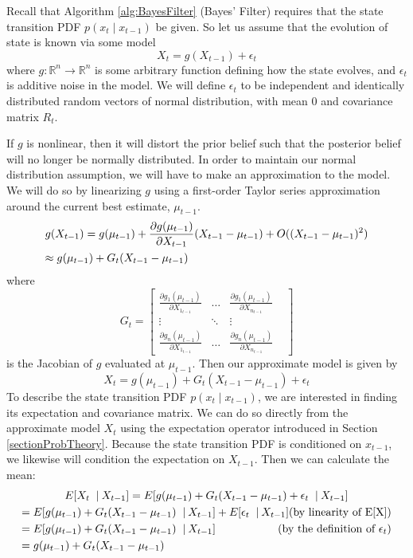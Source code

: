 Recall that Algorithm \ref{alg:BayesFilter} (Bayes' Filter) requires that the state transition PDF \(p(x_t \mathbin{\vert} x_{t-1})\) be given. So let us assume that the evolution of state is known via some model \[X_t =  g(X_{t-1}) + \epsilon_t\] where \(g: \mathbb{R}^n \to \mathbb{R}^n\) is some arbitrary function defining how the state evolves, and \(\epsilon_t\) is additive noise in the model. We will define \(\epsilon_t\) to be independent and identically distributed  random vectors of normal distribution, with mean 0 and covariance matrix \(R_t\).

If \(g\) is nonlinear, then it will distort the prior belief such that the posterior belief will no longer be normally distributed. In order to maintain our normal distribution assumption, we will have to make an approximation to the model. We will do so by linearizing \(g\) using a first-order Taylor series approximation around the current best estimate, \(\mu_{t-1}\).
\begin{multline*}
g(X_{t-1}) = g(\mu_{t-1}) + \frac{\partial g(\mu_{t-1})}{\partial X_{t-1}} (X_{t-1} - \mu_{t-1}) + O((X_{t-1} - \mu_{t-1})^2) \\
\approx g(\mu_{t-1}) + G_t (X_{t-1} - \mu_{t-1}) \hfill
\end{multline*}
where \[
G_t = \begin{bmatrix} 
\frac{\partial g_1(\mu_{t-1})}{\partial X_{1_{t-1}}} & \dots & \frac{\partial g_1(\mu_{t-1})}{\partial X_{n_{t-1}}}\\
\vdots & \ddots & \vdots & \\
\frac{\partial g_n(\mu_{t-1})}{\partial X_{1_{t-1}}} & \dots & \frac{\partial g_n(\mu_{t-1})}{\partial X_{n_{t-1}}} 
\end{bmatrix} \] is the Jacobian of \(g\) evaluated at \(\mu_{t-1}\). Then our approximate model is given by
\begin{equation*}
X_t = g(\mu_{t-1}) + G_t (X_{t-1} - \mu_{t-1}) + \epsilon_t
\end{equation*}
To describe the state transition PDF \(p(x_t \mathbin{\vert} x_{t-1})\), we are interested in finding its expectation and covariance matrix. We can do so directly from the approximate model \(X_t\) using the expectation operator introduced in Section \ref{sectionProbTheory}. Because the state transition PDF is conditioned on \(x_{t-1}\), we likewise will condition the expectation on \(X_{t-1}\). Then we can calculate the mean:
\begin{multline*}
E[X_t\ \mathbin{\vert} X_{t-1}] = E[g(\mu_{t-1}) + G_t (X_{t-1} - \mu_{t-1}) + \epsilon_t\ \mathbin{\vert} X_{t-1}] \\
= E[g(\mu_{t-1}) + G_t (X_{t-1} - \mu_{t-1})\ \mathbin{\vert} X_{t-1}] + E[\epsilon_t\ \mathbin{\vert} X_{t-1}] \hfill \text{(by linearity of E[X])} \\
= E[g(\mu_{t-1}) + G_t (X_{t-1} - \mu_{t-1})\ \mathbin{\vert} X_{t-1}] \hfill \text{(by the definition of \(\epsilon_t\))} \\
= g(\mu_{t-1}) + G_t (X_{t-1} - \mu_{t-1}) \hfill
\end{multline*}

